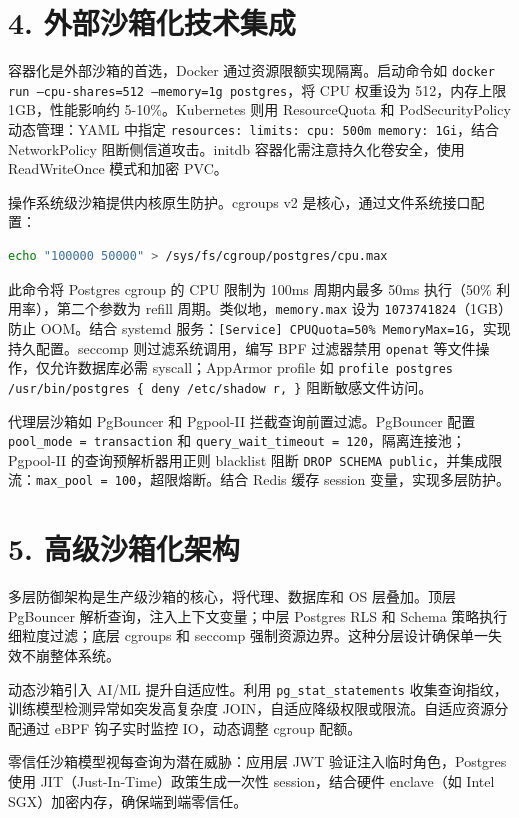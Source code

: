 \chapter{4. 外部沙箱化技术集成}
容器化是外部沙箱的首选，Docker 通过资源限额实现隔离。启动命令如 \texttt{docker run --cpu-shares=512 --memory=1g postgres}，将 CPU 权重设为 512，内存上限 1GB，性能影响约 5-10\%{}。Kubernetes 则用 ResourceQuota 和 PodSecurityPolicy 动态管理：YAML 中指定 \texttt{resources: limits: cpu: 500m memory: 1Gi}，结合 NetworkPolicy 阻断侧信道攻击。initdb 容器化需注意持久化卷安全，使用 ReadWriteOnce 模式和加密 PVC。\par
操作系统级沙箱提供内核原生防护。cgroups v2 是核心，通过文件系统接口配置：\par
\begin{lstlisting}[language=bash]
echo "100000 50000" > /sys/fs/cgroup/postgres/cpu.max
\end{lstlisting}
此命令将 Postgres cgroup 的 CPU 限制为 100ms 周期内最多 50ms 执行（50\%{} 利用率），第二个参数为 refill 周期。类似地，\texttt{memory.max} 设为 \texttt{1073741824}（1GB）防止 OOM。结合 systemd 服务：\texttt{[Service] CPUQuota=50\%{} MemoryMax=1G}，实现持久配置。seccomp 则过滤系统调用，编写 BPF 过滤器禁用 \texttt{openat} 等文件操作，仅允许数据库必需 syscall；AppArmor profile 如 \texttt{profile postgres /usr/bin/postgres \{{} deny /etc/shadow r, \}{}} 阻断敏感文件访问。\par
代理层沙箱如 PgBouncer 和 Pgpool-II 拦截查询前置过滤。PgBouncer 配置 \texttt{pool\_{}mode = transaction} 和 \texttt{query\_{}wait\_{}timeout = 120}，隔离连接池；Pgpool-II 的查询预解析器用正则 blacklist 阻断 \texttt{DROP SCHEMA public}，并集成限流：\texttt{max\_{}pool = 100}，超限熔断。结合 Redis 缓存 session 变量，实现多层防护。\par
\chapter{5. 高级沙箱化架构}
多层防御架构是生产级沙箱的核心，将代理、数据库和 OS 层叠加。顶层 PgBouncer 解析查询，注入上下文变量；中层 Postgres RLS 和 Schema 策略执行细粒度过滤；底层 cgroups 和 seccomp 强制资源边界。这种分层设计确保单一失效不崩整体系统。\par
动态沙箱引入 AI/ML 提升自适应性。利用 \texttt{pg\_{}stat\_{}statements} 收集查询指纹，训练模型检测异常如突发高复杂度 JOIN，自适应降级权限或限流。自适应资源分配通过 eBPF 钩子实时监控 IO，动态调整 cgroup 配额。\par
零信任沙箱模型视每查询为潜在威胁：应用层 JWT 验证注入临时角色，Postgres 使用 JIT（Just-In-Time）政策生成一次性 session，结合硬件 enclave（如 Intel SGX）加密内存，确保端到端零信任。\par
